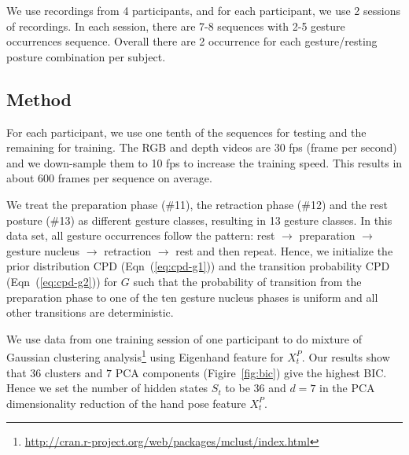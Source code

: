 \documentclass{acm_proc_article-sp}
\begin{document}
We use recordings from 4 participants, and for each participant, we use 2 sessions of recordings.     
In each session, there are 7-8 sequences with 2-5 gesture occurrences 
sequence. Overall there are 2 occurrence for each gesture/resting posture combination per subject. 

\subsection{Method}
For each participant, we use
one tenth of the sequences for testing and the remaining for training. The RGB and depth videos are 30 fps (frame per second) and we down-sample them
to 10 fps to increase the training speed. This results in about 600 frames per sequence on average.

We treat the preparation phase (\#11), the retraction phase (\#12) and the rest posture (\#13) as different gesture classes, resulting
in 13 gesture classes. In this data set, all gesture occurrences follow the pattern: rest $\rightarrow$ preparation
$\rightarrow$ gesture nucleus $\rightarrow$ retraction $\rightarrow$ rest and then repeat. 
Hence, we initialize the prior distribution CPD (Eqn~(\ref{eq:cpd-g1}))
and the transition probability CPD (Eqn~(\ref{eq:cpd-g2})) for $G$ such that the probability of transition from the preparation phase
to one of the ten gesture nucleus phases is uniform and all other transitions are deterministic.

We use data from one training session of one participant to do mixture of Gaussian
clustering analysis\footnote{\url{http://cran.r-project.org/web/packages/mclust/index.html}} using Eigenhand feature for $X_t^P$. 
Our results show that $36$ clusters and
$7$ PCA components (Figire~\ref{fig:bic}) give the highest BIC. Hence we set the number of hidden states $S_t$ to be $36$ and $d = 7$
in the PCA dimensionality reduction of the hand pose feature $X_t^P$.
\end{document}
